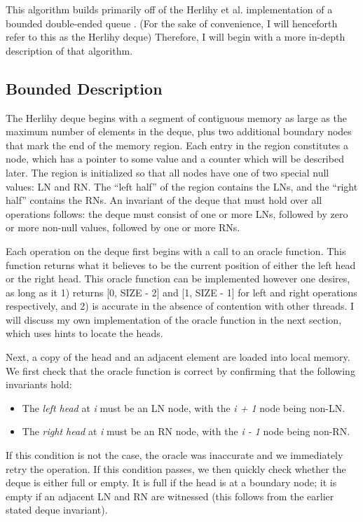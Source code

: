 \documentclass[11pt, letterpaper]{article}
\begin{document}
        This algorithm builds primarily off of the Herlihy et al. implementation of a bounded double-ended queue \cite{herlihy}. (For the sake of convenience, I will henceforth refer to this as the Herlihy deque) Therefore, I will begin with a more in-depth description of that algorithm.

        \subsection{Bounded Description}
            The Herlihy deque begins with a segment of contiguous memory as large as the maximum number of elements in the deque, plus two additional boundary nodes that mark the end of the memory region. Each entry in the region constitutes a node, which has a pointer to some value and a counter which will be described later. The region is initialized so that all nodes have one of two special null values: LN and RN. The ``left half'' of the region contains the LNs, and the ``right half'' contains the RNs. An invariant of the deque that must hold over all operations follows: the deque must consist of one or more LNs, followed by zero or more non-null values, followed by one or more RNs.

            Each operation on the deque first begins with a call to an oracle function. This function returns what it believes to be the current position of either the left head or the right head. This oracle function can be implemented however one desires, as long as it 1) returns [0, SIZE - 2] and [1, SIZE - 1] for left and right operations respectively, and 2) is accurate in the absence of contention with other threads. I will discuss my own implementation of the oracle function in the next section, which uses hints to locate the heads.

            Next, a copy of the head and an adjacent element are loaded into local memory. We first check that the oracle function is correct by confirming that the following invariants hold:
            \begin{itemize}
                \item The \emph{left head} at \emph{i} must be an LN node, with the \emph{i + 1} node being non-LN.
                \item The \emph{right head} at \emph{i} must be an RN node, with the \emph{i - 1} node being non-RN.
            \end{itemize}
            If this condition is not the case, the oracle was inaccurate and we immediately retry the operation. If this condition passes, we then quickly check whether the deque is either full or empty. It is full if the head is at a boundary node; it is empty if an adjacent LN and RN are witnessed (this follows from the earlier stated deque invariant).
\end{document}
